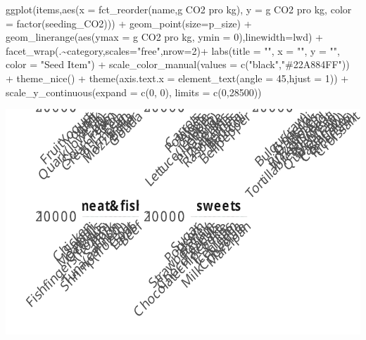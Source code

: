 \documentclass[
  letterpaper,
  DIV=11,
  numbers=noendperiod]{scrartcl}
\newenvironment{Shaded}{\begin{snugshade}}{\end{snugshade}}
\newcommand{\AttributeTok}[1]{\textcolor[rgb]{0.40,0.45,0.13}{#1}}
\newcommand{\DecValTok}[1]{\textcolor[rgb]{0.68,0.00,0.00}{#1}}
\newcommand{\FunctionTok}[1]{\textcolor[rgb]{0.28,0.35,0.67}{#1}}
\newcommand{\NormalTok}[1]{\textcolor[rgb]{0.00,0.23,0.31}{#1}}
\newcommand{\SpecialCharTok}[1]{\textcolor[rgb]{0.37,0.37,0.37}{#1}}
\newcommand{\StringTok}[1]{\textcolor[rgb]{0.13,0.47,0.30}{#1}}
\begin{document}
\begin{Shaded}
\begin{Highlighting}[]
\FunctionTok{ggplot}\NormalTok{(items,}\FunctionTok{aes}\NormalTok{(}\AttributeTok{x =} \FunctionTok{fct\_reorder}\NormalTok{(name,}\StringTok{\textasciigrave{}}\AttributeTok{g CO2 pro kg}\StringTok{\textasciigrave{}}\NormalTok{),}
                 \AttributeTok{y =} \StringTok{\textasciigrave{}}\AttributeTok{g CO2 pro kg}\StringTok{\textasciigrave{}}\NormalTok{,}
                 \AttributeTok{color =} \FunctionTok{factor}\NormalTok{(seeding\_CO2))) }\SpecialCharTok{+}
  \FunctionTok{geom\_point}\NormalTok{(}\AttributeTok{size=}\NormalTok{p\_size) }\SpecialCharTok{+}
  \FunctionTok{geom\_linerange}\NormalTok{(}\FunctionTok{aes}\NormalTok{(}\AttributeTok{ymax =} \StringTok{\textasciigrave{}}\AttributeTok{g CO2 pro kg}\StringTok{\textasciigrave{}}\NormalTok{, }\AttributeTok{ymin =} \DecValTok{0}\NormalTok{),}\AttributeTok{linewidth=}\NormalTok{lwd) }\SpecialCharTok{+}
  \FunctionTok{facet\_wrap}\NormalTok{(.}\SpecialCharTok{\textasciitilde{}}\NormalTok{category,}\AttributeTok{scales=}\StringTok{"free"}\NormalTok{,}\AttributeTok{nrow=}\DecValTok{2}\NormalTok{)}\SpecialCharTok{+}
  \FunctionTok{labs}\NormalTok{(}\AttributeTok{title =} \StringTok{""}\NormalTok{,}
       \AttributeTok{x     =} \StringTok{""}\NormalTok{,}
       \AttributeTok{y     =} \StringTok{""}\NormalTok{,}
       \AttributeTok{color =} \StringTok{"Seed Item"}\NormalTok{) }\SpecialCharTok{+}
  \FunctionTok{scale\_color\_manual}\NormalTok{(}\AttributeTok{values =} \FunctionTok{c}\NormalTok{(}\StringTok{"black"}\NormalTok{,}\StringTok{"\#22A884FF"}\NormalTok{)) }\SpecialCharTok{+}
  \FunctionTok{theme\_nice}\NormalTok{() }\SpecialCharTok{+}
  \FunctionTok{theme}\NormalTok{(}\AttributeTok{axis.text.x =} \FunctionTok{element\_text}\NormalTok{(}\AttributeTok{angle =} \DecValTok{45}\NormalTok{,}\AttributeTok{hjust =} \DecValTok{1}\NormalTok{)) }\SpecialCharTok{+}
  \FunctionTok{scale\_y\_continuous}\NormalTok{(}\AttributeTok{expand =} \FunctionTok{c}\NormalTok{(}\DecValTok{0}\NormalTok{, }\DecValTok{0}\NormalTok{), }\AttributeTok{limits =} \FunctionTok{c}\NormalTok{(}\DecValTok{0}\NormalTok{,}\DecValTok{28500}\NormalTok{))}
\end{Highlighting}
\end{Shaded}

\includegraphics{items_files/figure-pdf/unnamed-chunk-7-1.pdf}
\end{document}

